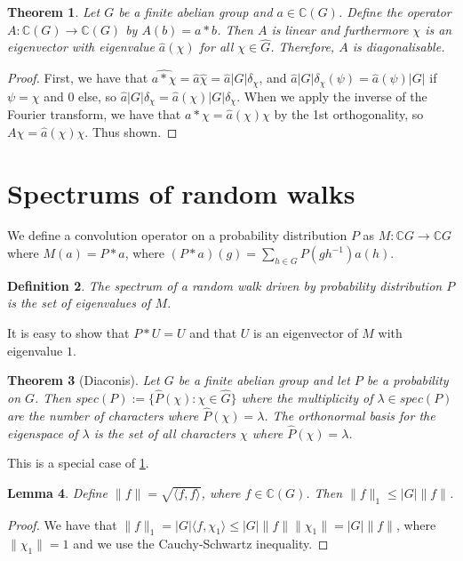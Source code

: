 \documentclass[]{article}
\newtheorem{theorem}{Theorem}
\newtheorem{lemma}[theorem]{Lemma}
\newtheorem{definition}[theorem]{Definition}
\theoremstyle{definition}
\numberwithin{theorem}{section}
\numberwithin{equation}{section}
\begin{document}
\begin{theorem}
	\label{thm:Eigenvector operators}
	Let $G$ be a finite abelian group and $a \in \mathbb{C}(G)$. Define the operator $A: \mathbb{C}(G) \rightarrow \mathbb{C}(G)$ by $A(b) = a \ast b$. Then $A$ is linear and furthermore $\chi$ is an eigenvector with eigenvalue $\widehat{a}(\chi)$ for all $\chi \in \widehat{G}$. Therefore, $A$ is diagonalisable. 
\end{theorem}

\begin{proof}
	First, we have that $\widehat{a\ast \chi} = \widehat{a} \widehat{\chi} = \widehat{a} |G| \delta_\chi$, and $\widehat{a} |G| \delta_\chi(\psi) = \widehat{a}(\psi) |G|$ if $\psi = \chi$ and 0 else, so $\widehat{a} |G| \delta_\chi = \widehat{a}(\chi) |G| \delta_\chi$. When we apply the inverse of the Fourier transform, we have that $a \ast \chi = \widehat{a}(\chi) \chi$ by the 1st orthogonality, so $A \chi = \widehat{a}(\chi) \chi$. Thus shown. 
\end{proof}

\section{Spectrums of random walks}
We define a convolution operator on a probability distribution $P$ as $M : \mathbb{C}G \rightarrow \mathbb{C}G$ where $M(a) = P \ast a$, where $(P \ast a) (g) =\sum_{h\in G} P(gh^{-1})a(h)$.
\begin{definition}
	The spectrum of a random walk driven by probability distribution $P$ is the set of eigenvalues of $M$. 
\end{definition} 
It is easy to show that $P \ast U = U$ and that $U$ is an eigenvector of $M$ with eigenvalue $1$. 


\begin{theorem}[Diaconis]
	\label{thm:Diaconis}
	Let $G$ be a finite abelian group and let $P$ be a probability on $G$. Then $spec(P) := \lbrace \widehat{P}(\chi) : \chi \in \widehat{G} \rbrace$ where the multiplicity of $\lambda \in spec(P)$ are the number of characters where $\widehat{P}(\chi) = \lambda$. The orthonormal basis for the eigenspace of $\lambda$ is the set of all characters $\chi$ where $\widehat{P}(\chi) = \lambda$. 
\end{theorem}
This is a special case of \cref{thm:Eigenvector operators}.

\begin{lemma}
	\label{lem:Absolute Value Inequality}
	Define $\|f\| = \sqrt{\langle f, f \rangle}$, where $f \in \mathbb{C}(G)$. Then $\|f \|_1 \leq |G| \|f \|$.
\end{lemma}
\begin{proof}
	We have that $\|f \|_1 = |G| \langle f, \chi_1 \rangle \leq |G| \|f \| \|\chi_1 \| = |G| \|f \|$, where $\|\chi_1 \| = 1$ and we use the Cauchy-Schwartz inequality. 
\end{proof}
\end{document}
